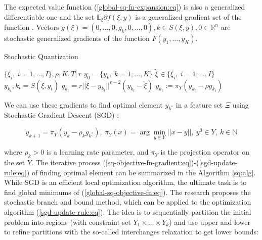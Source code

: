 The expected value function (\ref{global-sq-fn-expansion:eq}) is also a generalized differentiable one and the set $ \mathbb{E}_{\xi} \partial f(\xi, y) $ is a generalized gradient set of the function \cite{mikhalevich2024,Norkin_1986}. Vectors $ g(\xi) = (0, \ldots, 0, g_{k}, 0, \ldots, 0), k \in S(\xi, y), 0 \in \mathbb{R}^n $ are stochastic generalized gradients of the function $ F(y_1, \ldots, y_K) $.

\begin{algorithm}
    \caption{Stochastic Quantization}\label{sq:alg}
    \begin{algorithmic}
    \Require $ \{ \xi_i, \> i = 1, \ldots, I \}, \rho, K, T, r $
    \State $ y_0 = \{ y_k, \> k = 1, \ldots, K \} $ 
        \State $ \tilde{\xi} \in \{ \xi_i, \> i = 1, \ldots, I \} $ 
        \State $ y_{k_t}, k_t = S(\tilde{\xi}, y_t) $ 
        \State $ g_{k_t} = r || \tilde{\xi} - y_{k_t} ||^{r - 2} (y_{k_t} - \tilde{\xi}) $ 
        \State $ y_{k_t} := \pi_Y (y_{k_t} - \rho g_{k_t}) $ 
    \EndFor
    \end{algorithmic}
\end{algorithm}

We can use these gradients to find optimal element $ y_{k^*} $ in a feature set $ \Xi $ using Stochastic Gradient Descent (SGD) \cite{ermoliev1976stochastic,kiefer1952stochastic,Robbins_Monro_1951,Norkin_Kozyriev_Norkin_2024}:

\begin{equation}
    \label{sgd-update-rule:eq}
        y_{k+1} = \pi_Y (y_k - \rho_k g_{k^*}), \> \pi_Y (x) = \arg \min_{y \in Y} || x - y||, \> y^0 \in Y, \> k \in \mathbb{N}
\end{equation}

\noindent where $ \rho_k > 0 $ is a learning rate parameter, and $ \pi_Y $ is the projection operator on the set $ Y $. The iterative process (\ref{sq-objective-fn-gradient:eq})-(\ref{sgd-update-rule:eq}) of finding optimal element can be summarized in the Algorithm \ref{sq:alg}. While SGD is an efficient local optimization algorithm, the ultimate task is to find global minimums of (\ref{global-sq-objective-fn:eq}). The research \cite{Norkin_Pflug_Ruszczynski_1998} proposes the stochastic branch and bound method, which can be applied to the optimization algorithm (\ref{sgd-update-rule:eq}). The idea is to sequentially partition the initial problem into regions (with constraint set $ Y_1 \times \ldots \times Y_k $) and use upper and lower to refine partitions with the so-called interchanges relaxation to get lower bounds:

